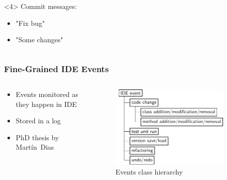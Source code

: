 \documentclass[aspectratio=169]{beamer}
\begin{document}
\begin{frame}[fragile]
\begin{columns}
\begin{column}{0.5\textwidth}
\begin{onlyenv}<4>
  Commit messages:
  \begin{itemize}
  \item "Fix bug"
  \item "Some changes"
  \end{itemize}
\end{onlyenv}

\end{column}

\end{columns}

\end{frame}

\begin{frame}[fragile]

\frametitle{Fine-Grained IDE Events}

\begin{columns}

\begin{column}{0.5\textwidth}

\begin{itemize}
\item Events monitored as they happen in IDE
\item Stored in a log
\item PhD thesis by Mart\'{i}n~Dias
\end{itemize}
\end{column}

\begin{column}{0.5\textwidth}

\begin{figure}
\begin{center}
\includegraphics[width=0.9\textwidth]{img/events_model_diagram.pdf}
\end{center}
\caption{Events class hierarchy}
\end{figure}

\end{column}

\end{columns}

\end{frame}
\end{document}
